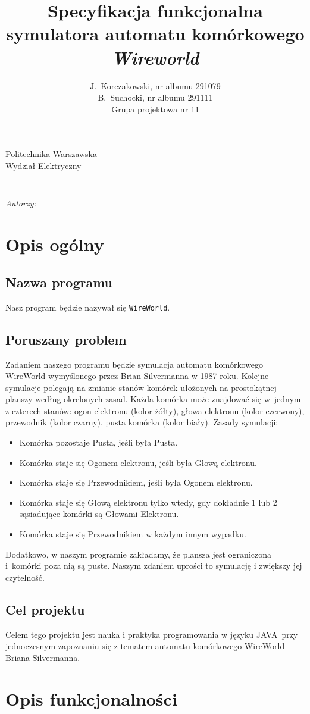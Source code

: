 \documentclass[a4paper,11pt, notitlepage ]{article}
\author{J.~Korczakowski, nr albumu 291079\\ B.~Suchocki, nr albumu 291111\\ Grupa projektowa nr 11}
\title{Specyfikacja funkcjonalna symulatora automatu komórkowego \textsl{Wireworld}}
\makeatletter
\newcommand{\linia}{\rule{\linewidth}{0.4mm}}
\renewcommand{\maketitle}{\begin{titlepage}
    \vspace*{1cm}
    \begin{center}\small
    Politechnika Warszawska\\
    Wydział Elektryczny
    \end{center}
    \vspace{3cm}
    \noindent\linia
    \begin{center}
      \LARGE \textsc{\@title}
         \end{center}
     \linia
    \vspace{0.5cm}
    \begin{flushright}
    \begin{minipage}{8cm}
    \textit{\small Autorzy:}\\
    \normalsize \textsc{\@author} \par
    \end{minipage}
    \end{flushright}
    \vspace*{\stretch{6}}
    \begin{center}
    \@date
    \end{center}
  \end{titlepage}%
}
\makeatother
\begin{document}
\maketitle
\setcounter{page}{2}
\section{Opis ogólny}
\subsection{Nazwa programu}
Nasz program będzie nazywał się \verb+WireWorld+.
\subsection{Poruszany problem}


Zadaniem naszego programu będzie symulacja automatu komórkowego WireWorld wymyślonego przez Brian Silvermanna w 1987 roku. Kolejne symulacje polegają na zmianie stanów komórek ułożonych na prostokątnej planszy według okrelonych zasad. Każda komórka może znajdować się w~jednym z czterech stanów: ogon elektronu (kolor żółty), głowa elektronu (kolor czerwony), przewodnik (kolor czarny), pusta komórka (kolor biały). Zasady symulacji:
\begin{itemize}
\item Komórka pozostaje Pusta, jeśli była Pusta.
\item Komórka staje się Ogonem elektronu, jeśli była Głową elektronu.
\item Komórka staje się Przewodnikiem, jeśli była Ogonem elektronu.
\item Komórka staje się Głową elektronu tylko wtedy, gdy dokładnie 1 lub 2 sąsiadujące komórki są Głowami Elektronu.
\item Komórka staje się Przewodnikiem w każdym innym wypadku.
\end{itemize}
\indent Dodatkowo, w naszym programie zakładamy, że plansza jest ograniczona i~komórki poza nią są puste. Naszym zdaniem uprości to symulację i zwiększy jej czytelność.

\subsection{Cel projektu}
Celem tego projektu jest nauka i praktyka programowania w języku JAVA~przy jednoczesnym zapoznaniu się z tematem automatu komórkowego WireWorld Briana Silvermanna.

\section{Opis funkcjonalności}
\end{document}
